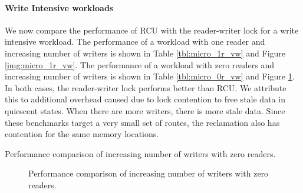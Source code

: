 \documentclass[a4paper,marginparwidth=50pt,marginparsep=10pt]{article}
\begin{document}
\paragraph{Write Intensive workloads}
We now compare the performance of RCU with the reader-writer lock for a write intensive workload. The performance of a workload with one reader and increasing number of writers is shown in Table \ref{tbl:micro_1r_vw} and Figure \ref{img:micro_1r_vw}. The performance of a workload with zero readers and increasing number of writers is shown in Table \ref{tbl:micro_0r_vw} and Figure \ref{img:micro_0r_vw}. In both cases, the reader-writer lock performs better than RCU. We attribute this to additional overhead caused due to lock contention to free stale data in quiescent states. When there are more writers, there is more stale data. Since these benchmarks target a very small set of routes, the reclamation also has contention for the same memory locations.

\begin{table}[tph]
\begin{center}

\end{center}
\label{tbl:micro_0r_vw}
\caption{Performance comparison of increasing number of writers with zero readers.}
\end{table}

\begin{figure}[tph]
\begin{center}
\caption{Performance comparison of increasing number of writers with zero readers.}
\label{img:micro_0r_vw}
\end{center}
\end{figure}
\end{document}

